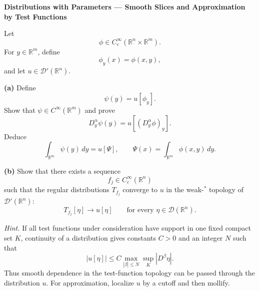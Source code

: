 \begin{problem}[CP-II-0083]
\label{prob:cp-ii-0083}
\textbf{Distributions with Parameters --- Smooth Slices and Approximation by Test Functions}

\hspace*{1.5em}Let
\[
\phi\in C_c^\infty(\mathbb R^n\times\mathbb R^m).
\]
For \(y\in\mathbb R^m\), define
\[
\phi_y(x)=\phi(x,y),
\]
and let \(u\in\mathcal D'(\mathbb R^n)\).

\par\smallskip\noindent\textbf{(a)}\quad
Define
\[
\psi(y)=u[\phi_y].
\]
Show that \(\psi\in C^\infty(\mathbb R^m)\) and prove
\[
D_y^\alpha\psi(y)
=
u[(D_y^\alpha\phi)_y].
\]
Deduce
\[
\int_{\mathbb R^m}\psi(y)\,dy
=
u[\Psi],
\qquad
\Psi(x)
=
\int_{\mathbb R^m}\phi(x,y)\,dy.
\]

\par\smallskip\noindent\textbf{(b)}\quad
Show that there exists a sequence
\[
f_j\in C_c^\infty(\mathbb R^n)
\]
such that the regular distributions \(T_{f_j}\) converge to \(u\) in the
weak-\(^*\) topology of \(\mathcal D'(\mathbb R^n)\):
\[
T_{f_j}[\eta]\longrightarrow u[\eta]
\qquad
\text{for every }\eta\in\mathcal D(\mathbb R^n).
\]

\medskip
\noindent\emph{Hint.} If all test functions under consideration have support in one fixed compact
set \(K\), continuity of a distribution gives constants \(C>0\) and an
integer \(N\) such that
\[
|u[\eta]|
\le
C
\max_{|\beta|\le N}
\sup_K|D^\beta\eta|.
\]
Thus smooth dependence in the test-function topology can be passed through
the distribution \(u\). For approximation, localize \(u\) by a cutoff and
then mollify.
\end{problem}

